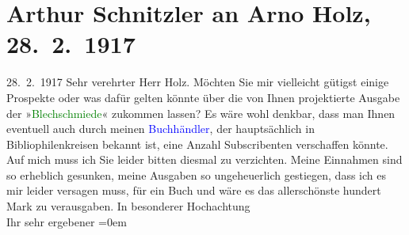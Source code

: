 

               \section[Arthur Schnitzler an Arno Holz, 28. 2. 1917]{ Arthur Schnitzler an Arno Holz, 28. 2. 1917}\nopagebreak{}\rehead{ }\normalsize\beginnumbering{} \toendnotes[C]{\smallbreak\pagebreak[2]} 
\toendnotes[C]{\smallbreak}\pstart
           \raggedleft{}{\pb}28. 2. 1917\pend
           \pstart\center{}Sehr verehrter Herr Holz.\pend\pstart
           Möchten Sie mir vielleicht gütigst einige Prospekte oder was dafür gelten könnte
                    über die von Ihnen projektierte Ausgabe der »\textcolor{green}{Blechschmiede}{}\ledrightnote{\textcolor{green}{Die Blechschmiede}}« zukommen lassen? Es wäre wohl denkbar, dass man Ihnen
                    eventuell auch durch meinen \textcolor{blue}{Buchhändler}{}, der hauptsächlich in Bibliophilenkreisen bekannt ist,
                    eine Anzahl Subscribenten verschaffen könnte. Auf mich muss ich Sie leider
                    bitten diesmal zu verzichten. Meine Einnahmen sind so erheblich gesunken, meine
                    Ausgaben so ungeheuerlich gestiegen, dass \introOben{}ich\introOben{} es mir
                    leider versagen muss, für ein Buch und wäre es das allerschönste hundert Mark zu
                    verausgaben.\pend
           \pstart
           In besonderer Hochachtung{\\[\baselineskip]} Ihr sehr ergebener\pend
           \leftskip=0em{}\endnumbering{}  
      